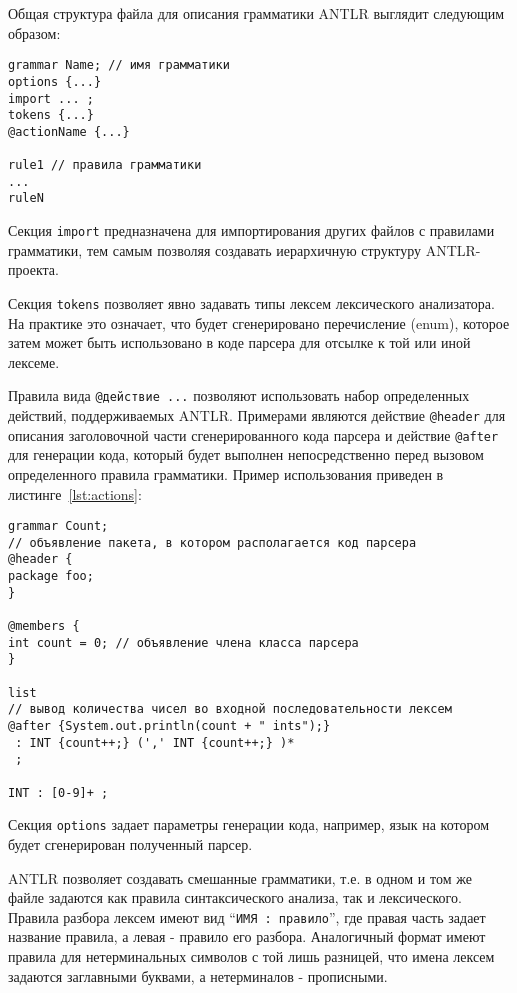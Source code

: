 Общая структура файла для описания грамматики ANTLR выглядит следующим образом:

\begin{lstlisting}[caption={Структура грамматики ANTLR}]
grammar Name; // имя грамматики
options {...}
import ... ;
tokens {...}
@actionName {...}

rule1 // правила грамматики
...
ruleN
\end{lstlisting}

Секция \texttt{import} предназначена для импортирования других файлов с
правилами грамматики, тем самым позволяя создавать иерархичную структуру
ANTLR-проекта.

Секция \texttt{tokens} позволяет явно задавать типы лексем лексического
анализатора. На практике это означает, что будет сгенерировано перечисление
(enum), которое затем может быть использовано в коде парсера для отсылке к той
или иной лексеме.

Правила вида \texttt{@действие {...}} позволяют использовать набор определенных
действий, поддерживаемых ANTLR. Примерами являются действие \texttt{@header} для
описания заголовочной части сгенерированного кода парсера и действие
\texttt{@after} для генерации кода, который будет выполнен непосредственно перед
вызовом определенного правила грамматики. Пример использования приведен в
листинге~\ref{lst:actions}:

\begin{lstlisting}[caption={Использование действий ANTLR}, label={lst:actions}]
grammar Count;
// объявление пакета, в котором располагается код парсера
@header {
package foo;
}

@members {
int count = 0; // объявление члена класса парсера
}

list
// вывод количества чисел во входной последовательности лексем
@after {System.out.println(count + " ints");}
 : INT {count++;} (',' INT {count++;} )*
 ;

INT : [0-9]+ ;
\end{lstlisting}

Секция \texttt{options} задает параметры генерации кода, например, язык на
котором будет сгенерирован полученный парсер.

ANTLR позволяет создавать смешанные грамматики, т.е. в одном и том же файле
задаются как правила синтаксического анализа, так и лексического. Правила
разбора лексем имеют вид ``\texttt{ИМЯ : правило}'', где правая часть задает
название правила, а левая - правило его разбора. Аналогичный формат имеют
правила для нетерминальных символов с той лишь разницей, что имена лексем
задаются заглавными буквами, а нетерминалов - прописными.

